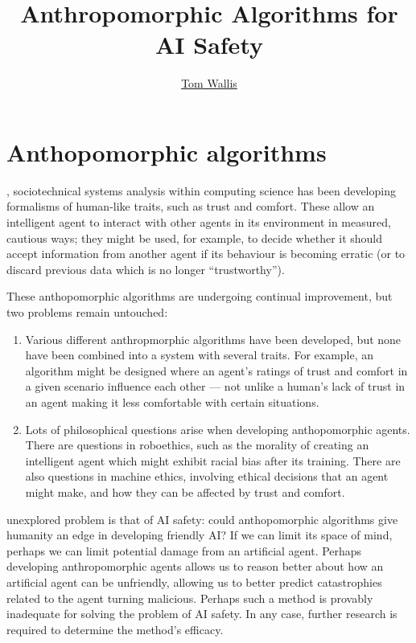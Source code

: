 
\title{Anthropomorphic Algorithms for AI Safety}
\author[Tom Wallis]{\href{http://tom.coffee}{Tom Wallis}}
\date{}



\maketitle

\section{Anthopomorphic algorithms}
, sociotechnical systems analysis within computing science has been developing formalisms of human-like traits, such as trust and comfort. These allow an intelligent agent to interact with other agents in its environment in measured, cautious ways; they might be used, for example, to decide whether it should accept information from another agent if its behaviour is becoming erratic (or to discard previous data which is no longer ``trustworthy''). \par

These anthopomorphic algorithms are undergoing continual improvement\cite{Kramdi}\cite{Urbano2014}, but two problems remain untouched:
\begin{enumerate}
    \item Various different anthropmorphic algorithms have been developed, but none have been combined into a system with several traits. {\newline}For example, an algorithm might be designed where an agent's ratings of trust and comfort in a given scenario influence each other --- not unlike a human's lack of trust in an agent making it less comfortable with certain situations.
    \item Lots of philosophical questions arise when developing anthopomorphic agents. There are questions in roboethics, such as the morality of creating an intelligent agent which might exhibit racial bias after its training. There are also questions in machine ethics, involving ethical decisions that an agent might make, and how they can be affected by trust and comfort.
\end{enumerate}

\bigskip
{} unexplored problem is that of AI safety: could anthopomorphic algorithms give humanity an edge in developing friendly AI\@? If we can limit its space of mind\cite{shanahan}, perhaps we can limit potential damage from an artificial agent. Perhaps developing anthropomorphic agents allows us to reason better about how an artificial agent can be unfriendly, allowing us to better predict catastrophies related to the agent turning malicious. Perhaps such a method is provably inadequate for solving the problem of AI safety. In any case, further research is required to determine the method's efficacy.

